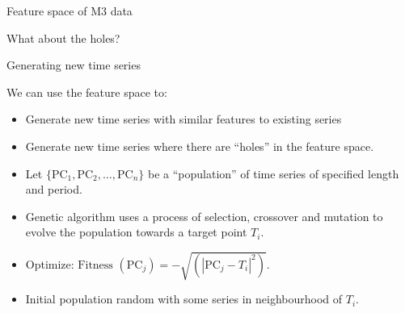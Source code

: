 \documentclass[14pt]{beamer}
\begin{document}
\begin{frame}{Feature space of M3 data}

\end{frame}

\begin{frame}{What about the holes?}


\end{frame}

\begin{frame}{Generating new time series}\fontsize{13}{14.5}\sf

\begin{block}{}
We can use the feature space to:
\begin{itemize}
\item[\ding{229}] Generate new time series with similar features to existing series
\item[\ding{229}] Generate new time series where there are ``holes'' in the feature space.
\end{itemize}
\end{block}
\pause\vspace*{-0.4cm}

\begin{itemize}
\item Let $\{\text{PC}_1,\text{PC}_2,\dots,\text{PC}_{n}\}$ be a ``population'' of time series of specified length and period.
\item Genetic algorithm uses a process of selection, crossover and mutation to evolve the population towards a target point $T_i$.
\item Optimize: $\text{Fitness }(\text{PC}_j) = - \sqrt{(|\text{PC}_j-T_i|^2)}$.
\item Initial population random with some series in neighbourhood of $T_i$.
\end{itemize}
\end{frame}
\end{document}
